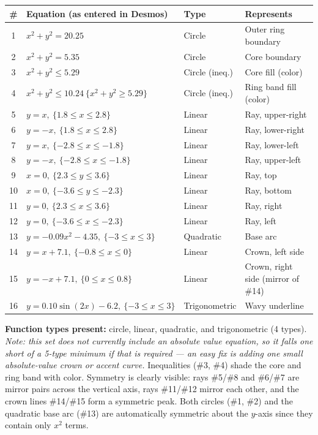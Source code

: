 \documentclass[11pt]{article}
\begin{document}
\begin{center}
\begin{tabular}{@{}clll@{}}
\toprule
\# & Equation (as entered in Desmos) & Type & Represents \\
\midrule
1  & $x^2+y^2=20.25$                                     & Circle        & Outer ring boundary \\
2  & $x^2+y^2=5.35$                                       & Circle        & Core boundary \\
3  & $x^2+y^2 \le 5.29$                                   & Circle (ineq.) & Core fill (color) \\
4  & $x^2+y^2 \le 10.24 \ \{x^2+y^2 \ge 5.29\}$           & Circle (ineq.) & Ring band fill (color) \\
5  & $y=x,\ \{1.8\le x\le 2.8\}$                          & Linear        & Ray, upper-right \\
6  & $y=-x,\ \{1.8\le x\le 2.8\}$                         & Linear        & Ray, lower-right \\
7  & $y=x,\ \{-2.8\le x\le -1.8\}$                        & Linear        & Ray, lower-left \\
8  & $y=-x,\ \{-2.8\le x\le -1.8\}$                       & Linear        & Ray, upper-left \\
9  & $x=0,\ \{2.3\le y\le 3.6\}$                          & Linear        & Ray, top \\
10 & $x=0,\ \{-3.6\le y\le -2.3\}$                        & Linear        & Ray, bottom \\
11 & $y=0,\ \{2.3\le x\le 3.6\}$                          & Linear        & Ray, right \\
12 & $y=0,\ \{-3.6\le x\le -2.3\}$                        & Linear        & Ray, left \\
13 & $y=-0.09x^2-4.35,\ \{-3\le x\le 3\}$                 & Quadratic     & Base arc \\
14 & $y=x+7.1,\ \{-0.8\le x\le 0\}$                       & Linear        & Crown, left side \\
15 & $y=-x+7.1,\ \{0\le x\le 0.8\}$                       & Linear        & Crown, right side (mirror of \#14) \\
16 & $y=0.10\sin(2x)-6.2,\ \{-3\le x\le 3\}$              & Trigonometric & Wavy underline \\
\bottomrule
\end{tabular}
\end{center}

\noindent \textbf{Function types present:} circle, linear, quadratic, and
trigonometric (4 types). \textit{Note: this set does not currently include an
absolute value equation, so it falls one short of a 5-type minimum if that is
required — an easy fix is adding one small absolute-value crown or accent curve.}
Inequalities (\#3, \#4) shade the core and ring band with color. Symmetry is
clearly visible: rays \#5/\#8 and \#6/\#7 are mirror pairs across the vertical axis,
rays \#11/\#12 mirror each other, and the crown lines \#14/\#15 form a symmetric
peak. Both circles (\#1, \#2) and the quadratic base arc (\#13) are automatically
symmetric about the $y$-axis since they contain only $x^2$ terms.
\end{document}

